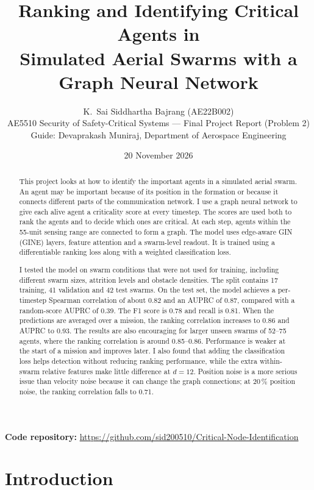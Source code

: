\documentclass[11pt,a4paper]{article}
\title{\textbf{Ranking and Identifying Critical Agents in\\ Simulated Aerial Swarms with a Graph Neural Network}}
\author{K.\ Sai Siddhartha Bajrang \quad (AE22B002)\\[3pt]
\small AE5510 Security of Safety-Critical Systems --- Final Project Report (Problem 2)\\
\small Guide: Devaprakash Muniraj, Department of Aerospace Engineering}
\date{20 November 2026}
\newcommand{\coderepo}{https://github.com/sid200510/Critical-Node-Identification}
\begin{document}
\maketitle

\begin{abstract}
\noindent
This project looks at how to identify the important agents in a simulated aerial swarm. An agent may be important because of its position in the formation or because it connects different parts of the communication network. I use a graph neural network to give each alive agent a criticality score at every timestep. The scores are used both to rank the agents and to decide which ones are critical. At each step, agents within the 55-unit sensing range are connected to form a graph. The model uses edge-aware GIN (GINE) layers, feature attention and a swarm-level readout. It is trained using a differentiable ranking loss along with a weighted classification loss.

I tested the model on swarm conditions that were not used for training, including different swarm sizes, attrition levels and obstacle densities. The split contains 17 training, 41 validation and 42 test swarms. On the test set, the model achieves a per-timestep Spearman correlation of about 0.82 and an AUPRC of 0.87, compared with a random-score AUPRC of 0.39. The F1 score is 0.78 and recall is 0.81. When the predictions are averaged over a mission, the ranking correlation increases to 0.86 and AUPRC to 0.93. The results are also encouraging for larger unseen swarms of 52--75 agents, where the ranking correlation is around 0.85--0.86. Performance is weaker at the start of a mission and improves later. I also found that adding the classification loss helps detection without reducing ranking performance, while the extra within-swarm relative features make little difference at $d=12$. Position noise is a more serious issue than velocity noise because it can change the graph connections; at 20\,\% position noise, the ranking correlation falls to 0.71.

\end{abstract}

\noindent\textbf{Code repository:} \url{\coderepo}

\section{Introduction}
\FloatBarrier
\end{document}
